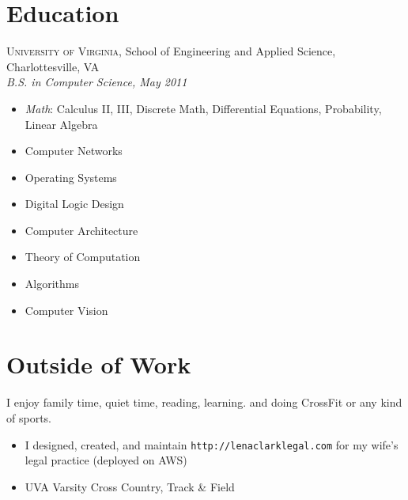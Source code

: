 \documentclass[12pt]{article}
\begin{document}

\section*{Education}

  \textsc{University of Virginia}, School of Engineering and Applied Science,
  Charlottesville, VA \\
  \textit{B.S. in Computer Science, May 2011}

  \begin{multicols}{3}
    \raggedright

    \begin{itemize}
    \item \textit{Math}: Calculus II, III, Discrete Math, Differential
      Equations, Probability, Linear Algebra
    \item Computer Networks
    \item Operating Systems
    \item Digital Logic Design
    \item Computer Architecture
    \item Theory of Computation
    \item Algorithms
    \item Computer Vision
    \end{itemize}
  \end{multicols}



\vskip 4pt
\section*{Outside of Work}

I enjoy family time, quiet time, reading, learning. and doing CrossFit or any
kind of sports.

\begin{itemize}
\item I designed, created, and maintain \texttt{http://lenaclarklegal.com} for
  my wife's legal practice (deployed on AWS)
\item UVA Varsity Cross Country, Track \& Field
\end{itemize}
\end{document}
